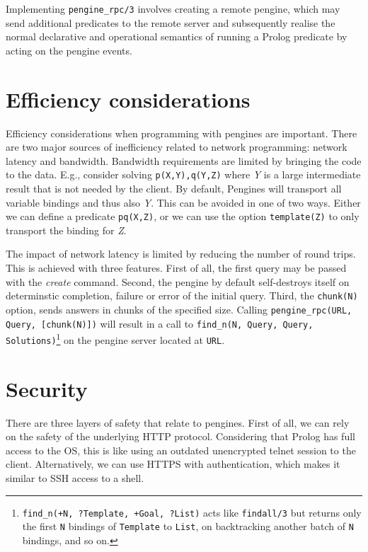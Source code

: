 \documentclass{new_tlp}
\renewcommand{\arg}[1]{\textit{#1}}
\begin{document}
Implementing \texttt{pengine\_rpc/3} involves creating a remote pengine,
which may send additional predicates to the remote server and
subsequently realise the normal declarative and operational semantics of
running a Prolog predicate by acting on the pengine events.



\section{Efficiency considerations}
\label{sec:efficiency}

Efficiency considerations when programming with pengines are important.
There are two major sources of inefficiency related to network
programming: network latency and bandwidth. Bandwidth requirements are
limited by bringing the code to the data. E.g., consider solving
\verb$p(X,Y),q(Y,Z)$ where \arg{Y} is a large intermediate result that
is not needed by the client. By default, Pengines will transport all
variable bindings and thus also \arg{Y}. This can be avoided in one of
two ways. Either we can define a predicate \texttt{pq(X,Z)}, or we
can use the option \texttt{template(Z)} to only transport the binding
for \arg{Z}.

The impact of network latency is limited by reducing the number of round
trips. This is achieved with three features. First of all, the first
query may be passed with the \textit{create} command. Second, the
pengine by default self-destroys itself on determinstic completion,
failure or error of the initial query. Third, the \texttt{chunk(N)}
option, sends answers in chunks of the specified size. Calling
\texttt{pengine\_rpc(URL, Query, [chunk(N)])} will result in a call to
\texttt{find\_n(N, Query, Query,
Solutions)}\footnote{\texttt{find\_n(+N, ?Template, +Goal, ?List)} acts
like \texttt{findall/3} but returns only the first \texttt{N}
bindings of \texttt{Template} to \texttt{List}, on backtracking another
batch of \texttt{N} bindings, and so on.} on the pengine server located
at \texttt{URL}.


\section{Security}
\label{sec:security}

There are three layers of safety that relate to pengines. First of all, we
can rely on the safety of the underlying HTTP protocol. Considering that
Prolog has full access to the OS, this is like using an outdated
unencrypted telnet session to the client. Alternatively, we can use
HTTPS with authentication, which makes it similar to SSH access to a
shell.
\end{document}
